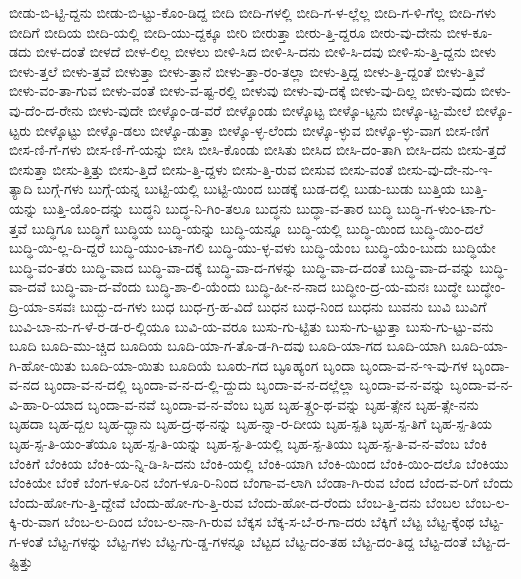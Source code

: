 {ಬೀಡು-ಬಿ-ಟ್ಟಿ-ದ್ದನು
ಬೀಡು-ಬಿ-ಟ್ಟು-ಕೊಂ-ಡಿದ್ದ
ಬೀದಿ
ಬೀದಿ-ಗಳಲ್ಲಿ
ಬೀದಿ-ಗ-ಳ-ಲ್ಲೆಲ್ಲ
ಬೀದಿ-ಗ-ಳಿ-ಗೆಲ್ಲ
ಬೀದಿ-ಗಳು
ಬೀದಿಗೆ
ಬೀದಿಯ
ಬೀದಿ-ಯಲ್ಲಿ
ಬೀದಿ-ಯು-ದ್ದಕ್ಕೂ
ಬೀರಿ
ಬೀರುತ್ತಾ
ಬೀರು-ತ್ತಿ-ದ್ದರೂ
ಬೀರು-ವು-ದೇನು
ಬೀಳ-ಕೂ-ಡದು
ಬೀಳ-ದಂತೆ
ಬೀಳದೆ
ಬೀಳ-ಲಿಲ್ಲ
ಬೀಳಲು
ಬೀಳಿ-ಸಿದ
ಬೀಳಿ-ಸಿ-ದನು
ಬೀಳಿ-ಸಿ-ದವು
ಬೀಳಿ-ಸು-ತ್ತಿ-ದ್ದನು
ಬೀಳು
ಬೀಳು-ತ್ತಲೆ
ಬೀಳು-ತ್ತವೆ
ಬೀಳುತ್ತಾ
ಬೀಳು-ತ್ತಾನೆ
ಬೀಳು-ತ್ತಾ-ರಂ-ತಲ್ಲಾ
ಬೀಳು-ತ್ತಿದ್ದ
ಬೀಳು-ತ್ತಿ-ದ್ದಂತೆ
ಬೀಳು-ತ್ತಿವೆ
ಬೀಳು-ವಂ-ತಾ-ಗುವ
ಬೀಳು-ವಂತೆ
ಬೀಳು-ವ-ಷ್ಟ-ರಲ್ಲಿ
ಬೀಳುವು
ಬೀಳು-ವು-ದಕ್ಕೆ
ಬೀಳು-ವು-ದಿಲ್ಲ
ಬೀಳು-ವುದು
ಬೀಳು-ವು-ದೆಂ-ದ-ರೇನು
ಬೀಳು-ವುದೇ
ಬೀಳ್ಕೊಂ-ಡ-ವರೆ
ಬೀಳ್ಕೊಂಡು
ಬೀಳ್ಕೊಟ್ಟ
ಬೀಳ್ಕೊ-ಟ್ಟನು
ಬೀಳ್ಕೊ-ಟ್ಟ-ಮೇಲೆ
ಬೀಳ್ಕೊ-ಟ್ಟರು
ಬೀಳ್ಕೊಟ್ಟು
ಬೀಳ್ಕೊ-ಡಲು
ಬೀಳ್ಕೊ-ಡುತ್ತಾ
ಬೀಳ್ಕೊ-ಳ್ಳ-ಲೆಂದು
ಬೀಳ್ಕೊ-ಳ್ಳುವ
ಬೀಳ್ಕೊ-ಳ್ಳು-ವಾಗ
ಬೀಸ-ಣಿಗೆ
ಬೀಸ-ಣಿ-ಗೆ-ಗಳು
ಬೀಸ-ಣಿ-ಗೆ-ಯನ್ನು
ಬೀಸಿ
ಬೀಸಿ-ಕೊಂಡು
ಬೀಸಿತು
ಬೀಸಿದ
ಬೀಸಿ-ದಂ-ತಾಗಿ
ಬೀಸಿ-ದನು
ಬೀಸು-ತ್ತದೆ
ಬೀಸುತ್ತಾ
ಬೀಸು-ತ್ತಿತ್ತು
ಬೀಸು-ತ್ತಿದೆ
ಬೀಸು-ತ್ತಿ-ದ್ದಳು
ಬೀಸು-ತ್ತಿ-ರುವ
ಬೀಸುವ
ಬೀಸು-ವಂತೆ
ಬೀಸು-ವು-ದೇ-ನು-ಇ-ತ್ಯಾದಿ
ಬುಗ್ಗೆ-ಗಳು
ಬುಗ್ಗೆ-ಯನ್ನ
ಬುಟ್ಟಿ-ಯಲ್ಲಿ
ಬುಟ್ಟಿ-ಯಿಂದ
ಬುಡಕ್ಕೆ
ಬುಡ-ದಲ್ಲಿ
ಬುಡು-ಬುಡು
ಬುತ್ತಿಯ
ಬುತ್ತಿ-ಯನ್ನು
ಬುತ್ತಿ-ಯೊಂ-ದನ್ನು
ಬುದ್ಧನಿ
ಬುದ್ಧ-ನಿ-ಗಿಂ-ತಲೂ
ಬುದ್ಧನು
ಬುದ್ಧಾ-ವ-ತಾರ
ಬುದ್ಧಿ
ಬುದ್ಧಿ-ಗ-ಳುಂ-ಟಾ-ಗು-ತ್ತವೆ
ಬುದ್ಧಿಗೂ
ಬುದ್ಧಿಗೆ
ಬುದ್ಧಿಯ
ಬುದ್ಧಿ-ಯನ್ನು
ಬುದ್ಧಿ-ಯನ್ನೂ
ಬುದ್ಧಿ-ಯಲ್ಲಿ
ಬುದ್ಧಿ-ಯಿಂದ
ಬುದ್ಧಿ-ಯಿಂ-ದಲೆ
ಬುದ್ಧಿ-ಯಿ-ಲ್ಲ-ದಿ-ದ್ದರೆ
ಬುದ್ಧಿ-ಯುಂ-ಟಾ-ಗಲಿ
ಬುದ್ಧಿ-ಯು-ಳ್ಳ-ವಳು
ಬುದ್ಧಿ-ಯೆಂಬ
ಬುದ್ಧಿ-ಯೆಂ-ಬುದು
ಬುದ್ಧಿಯೇ
ಬುದ್ಧಿ-ವಂ-ತರು
ಬುದ್ಧಿ-ವಾದ
ಬುದ್ಧಿ-ವಾ-ದಕ್ಕೆ
ಬುದ್ಧಿ-ವಾ-ದ-ಗಳನ್ನು
ಬುದ್ಧಿ-ವಾ-ದ-ದಂತೆ
ಬುದ್ಧಿ-ವಾ-ದ-ವನ್ನು
ಬುದ್ಧಿ-ವಾ-ದವೆ
ಬುದ್ಧಿ-ವಾ-ದ-ವೆಂದು
ಬುದ್ಧಿ-ಶಾ-ಲಿ-ಯೆಂದು
ಬುದ್ಧಿ-ಹೀ-ನ-ನಾದ
ಬುದ್ಧೀಂ-ದ್ರ-ಯ-ಮನಃ
ಬುದ್ಧೇ
ಬುದ್ಧೇಂ-ದ್ರಿ-ಯಾ-ಽಸವಃ
ಬುದ್ಬು-ದ-ಗಳು
ಬುಧ
ಬುಧ-ಗ್ರ-ಹ-ವಿದೆ
ಬುಧನ
ಬುಧ-ನಿಂದ
ಬುಧನು
ಬುವನು
ಬುವಿ
ಬುವಿಗೆ
ಬುವಿ-ಬಾ-ನು-ಗ-ಳೆ-ರ-ಡ-ರ-ಲ್ಲಿಯೂ
ಬುವಿ-ಯ-ವರೂ
ಬುಸು-ಗು-ಟ್ಟಿತು
ಬುಸು-ಗು-ಟ್ಟುತ್ತಾ
ಬುಸು-ಗು-ಟ್ಟು-ವನು
ಬೂದಿ
ಬೂದಿ-ಮು-ಚ್ಚಿದ
ಬೂದಿಯ
ಬೂದಿ-ಯಾ-ಗ-ತೊ-ಡ-ಗಿ-ದವು
ಬೂದಿ-ಯಾ-ಗದ
ಬೂದಿ-ಯಾಗಿ
ಬೂದಿ-ಯಾ-ಗಿ-ಹೋ-ಯಿತು
ಬೂದಿ-ಯಾ-ಯಿತು
ಬೂದಿಯೆ
ಬೂರು-ಗದ
ಬೂೃಹ್ಯಂಗ
ಬೃಂದಾ
ಬೃಂದಾ-ವ-ನ-ಇ-ವು-ಗಳ
ಬೃಂದಾ-ವ-ನದ
ಬೃಂದಾ-ವ-ನ-ದಲ್ಲಿ
ಬೃಂದಾ-ವ-ನ-ದ-ಲ್ಲಿ-ದ್ದುದು
ಬೃಂದಾ-ವ-ನ-ದಲ್ಲೆಲ್ಲಾ
ಬೃಂದಾ-ವ-ನ-ವನ್ನು
ಬೃಂದಾ-ವ-ನ-ವಿ-ಹಾ-ರಿ-ಯಾದ
ಬೃಂದಾ-ವ-ನವೆ
ಬೃಂದಾ-ವ-ನ-ವೆಂಬ
ಬೃಹ
ಬೃಹ-ತ್ಗ್ರಂ-ಥ-ವನ್ನು
ಬೃಹ-ತ್ಸೇನ
ಬೃಹ-ತ್ಸೇ-ನನು
ಬೃಹದಾ
ಬೃಹ-ದ್ಬಲ
ಬೃಹ-ದ್ಭಾನು
ಬೃಹ-ದ್ರ-ಥ-ನನ್ನು
ಬೃಹ-ನ್ನಾ-ರ-ದೀಯ
ಬೃಹ-ಸ್ಪತಿ
ಬೃಹ-ಸ್ಪ-ತಿಗೆ
ಬೃಹ-ಸ್ಪ-ತಿಯ
ಬೃಹ-ಸ್ಪ-ತಿ-ಯಂ-ತೆಯೂ
ಬೃಹ-ಸ್ಪ-ತಿ-ಯನ್ನು
ಬೃಹ-ಸ್ಪ-ತಿ-ಯಲ್ಲಿ
ಬೃಹ-ಸ್ಪ-ತಿಯು
ಬೃಹ-ಸ್ಪ-ತಿ-ವ-ನ-ವೆಂಬ
ಬೆಂಕಿ
ಬೆಂಕಿಗೆ
ಬೆಂಕಿಯ
ಬೆಂಕಿ-ಯ-ನ್ನಿ-ಡಿ-ಸಿ-ದನು
ಬೆಂಕಿ-ಯಲ್ಲಿ
ಬೆಂಕಿ-ಯಾಗಿ
ಬೆಂಕಿ-ಯಿಂದ
ಬೆಂಕಿ-ಯಿಂ-ದಲೊ
ಬೆಂಕಿಯು
ಬೆಂಕಿಯೇ
ಬೆಂಕೆ
ಬೆಂಗ-ಳೂ-ರಿನ
ಬೆಂಗ-ಳೂ-ರಿ-ನಿಂದ
ಬೆಂಗಾ-ವ-ಲಾಗಿ
ಬೆಂಡಾ-ಗಿ-ರುವ
ಬೆಂದ
ಬೆಂದ-ವ-ರಿಗೆ
ಬೆಂದು
ಬೆಂದು-ಹೋ-ಗು-ತ್ತಿ-ದ್ದೇವೆ
ಬೆಂದು-ಹೋ-ಗು-ತ್ತಿ-ರುವ
ಬೆಂದು-ಹೋ-ದ-ರೆಂದು
ಬೆಂಬ-ತ್ತಿ-ದನು
ಬೆಂಬಲ
ಬೆಂಬ-ಲ-ಕ್ಕಿ-ರು-ವಾಗ
ಬೆಂಬ-ಲ-ದಿಂದ
ಬೆಂಬ-ಲ-ನಾ-ಗಿ-ರುವ
ಬೆಕ್ಕಸ
ಬೆಕ್ಕ-ಸ-ಬೆ-ರ-ಗಾ-ದರು
ಬೆಕ್ಕಿಗೆ
ಬೆಟ್ಟ
ಬೆಟ್ಟ-ಕ್ಕೆಂಥ
ಬೆಟ್ಟ-ಗ-ಳಂತೆ
ಬೆಟ್ಟ-ಗಳನ್ನು
ಬೆಟ್ಟ-ಗಳು
ಬೆಟ್ಟ-ಗು-ಡ್ಡ-ಗಳನ್ನೂ
ಬೆಟ್ಟದ
ಬೆಟ್ಟ-ದಂ-ತಹ
ಬೆಟ್ಟ-ದಂ-ತಿದ್ದ
ಬೆಟ್ಟ-ದಂತೆ
ಬೆಟ್ಟ-ದ-ಷ್ಟಿತ್ತು
}
